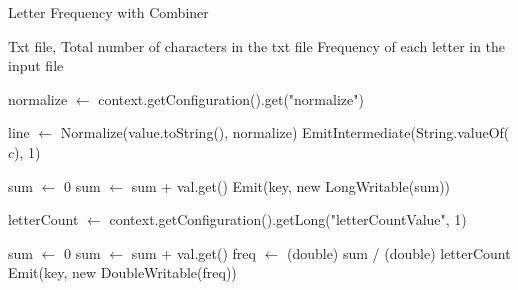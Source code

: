     \begin{algorithm}[H]
    \caption{Letter Frequency with Combiner}
    \begin{algorithmic}[1]
    \Require Txt file, Total number of characters in the txt file
    \Ensure Frequency of each letter in the input file
    
    \Statex
            \State normalize $\leftarrow$ context.getConfiguration().get("normalize")
        \EndProcedure
    
            \State line $\leftarrow$ Normalize(value.toString(), normalize) 
                \State EmitIntermediate(String.valueOf($c$), 1)
            \EndFor
        \EndProcedure
    \EndClass
    
    \Statex
            \State sum $\leftarrow$ 0
                \State sum $\leftarrow$ sum + val.get()
            \EndFor
            \State Emit(key, new LongWritable(sum))
        \EndProcedure
    \EndClass
    
    \Statex
            \State letterCount $\leftarrow$ context.getConfiguration().getLong("letterCountValue", 1)
        \EndProcedure
    
            \State sum $\leftarrow$ 0
                \State sum $\leftarrow$ sum + val.get()
            \EndFor
            \State freq $\leftarrow$ (double) sum / (double) letterCount
            \State Emit(key, new DoubleWritable(freq))
        \EndProcedure
    \EndClass
    \end{algorithmic}
    \end{algorithm}
    